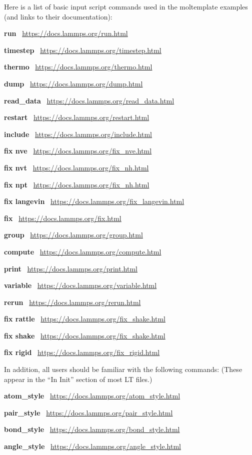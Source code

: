 \documentclass[11pt]{article}
\begin{document}
Here is a list of basic input script commands 
used in the moltemplate examples
(and links to their documentation):
\begin{list}{}
\item \textbf{run} \ 
\url{https://docs.lammps.org/run.html}
\item \textbf{timestep} \ 
\url{https://docs.lammps.org/timestep.html}
\item \textbf{thermo} \ \url{https://docs.lammps.org/thermo.html}
\item \textbf{dump} \ \url{https://docs.lammps.org/dump.html}
\item \textbf{read\_data} \ \url{https://docs.lammps.org/read_data.html}
\item \textbf{restart} \ \url{https://docs.lammps.org/restart.html}
\item \textbf{include} \ \url{https://docs.lammps.org/include.html}
\item \textbf{fix nve} \ \url{https://docs.lammps.org/fix_nve.html}
\item \textbf{fix nvt} \ \url{https://docs.lammps.org/fix_nh.html}
\item \textbf{fix npt} \ \url{https://docs.lammps.org/fix_nh.html}
\item \textbf{fix langevin} \ \url{https://docs.lammps.org/fix_langevin.html}
\item \textbf{fix} \ \url{https://docs.lammps.org/fix.html}
\item \textbf{group} \ \url{https://docs.lammps.org/group.html}
\item \textbf{compute} \ \url{https://docs.lammps.org/compute.html}
\item \textbf{print} \ \url{https://docs.lammps.org/print.html}
\item \textbf{variable} \ \url{https://docs.lammps.org/variable.html}
\item \textbf{rerun} \ \url{https://docs.lammps.org/rerun.html}
\item \textbf{fix rattle} \ \url{https://docs.lammps.org/fix_shake.html}
\item \textbf{fix shake} \ \url{https://docs.lammps.org/fix_shake.html}
\item \textbf{fix rigid} \ \url{https://docs.lammps.org/fix_rigid.html}
\end{list}
In addition, all users should be familiar with the following commands:
(These appear in the ``In Init'' section of most LT files.)
\begin{list}{}
\item \textbf{atom\_style} \ \url{https://docs.lammps.org/atom_style.html}
\item \textbf{pair\_style} \ \url{https://docs.lammps.org/pair_style.html}
\item \textbf{bond\_style} \ \url{https://docs.lammps.org/bond_style.html}
\item \textbf{angle\_style} \ \url{https://docs.lammps.org/angle_style.html}
\end{list}
\end{document}
